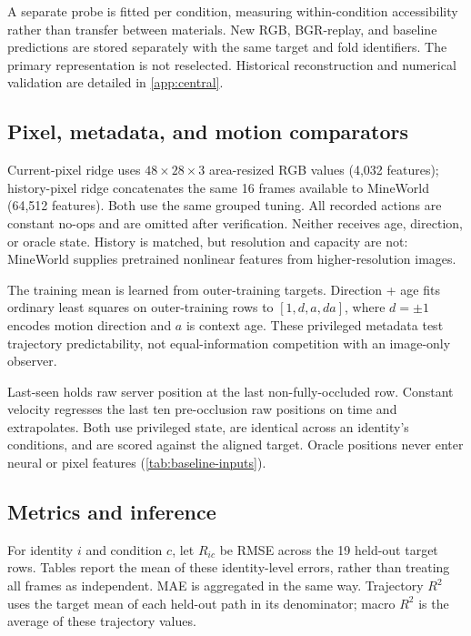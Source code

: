 \documentclass{article}
\begin{document}
A separate probe is fitted per condition, measuring within-condition accessibility rather than transfer between materials. New RGB, BGR-replay, and baseline predictions are stored separately with the same target and fold identifiers. The primary representation is not reselected. Historical reconstruction and numerical validation are detailed in \autoref{app:central}.

\subsection{Pixel, metadata, and motion comparators}
\label{sec:baselines}
Current-pixel ridge uses $48\times28\times3$ area-resized RGB values (4,032 features); history-pixel ridge concatenates the same 16 frames available to MineWorld (64,512 features). Both use the same grouped tuning. All recorded actions are constant no-ops and are omitted after verification. Neither receives age, direction, or oracle state. History is matched, but resolution and capacity are not: MineWorld supplies pretrained nonlinear features from higher-resolution images.

The training mean is learned from outer-training targets. Direction + age fits ordinary least squares on outer-training rows to $[1,d,a,da]$, where $d=\pm1$ encodes motion direction and $a$ is context age. These privileged metadata test trajectory predictability, not equal-information competition with an image-only observer.

Last-seen holds raw server position at the last non-fully-occluded row. Constant velocity regresses the last ten pre-occlusion raw positions on time and extrapolates. Both use privileged state, are identical across an identity's conditions, and are scored against the aligned target. Oracle positions never enter neural or pixel features (\autoref{tab:baseline-inputs}).




\subsection{Metrics and inference}
\label{sec:inference}
For identity $i$ and condition $c$, let $R_{ic}$ be RMSE across the 19 held-out target rows. Tables report the mean of these identity-level errors, rather than treating all frames as independent. MAE is aggregated in the same way. Trajectory $R^2$ uses the target mean of each held-out path in its denominator; macro $R^2$ is the average of these trajectory values.
\end{document}
